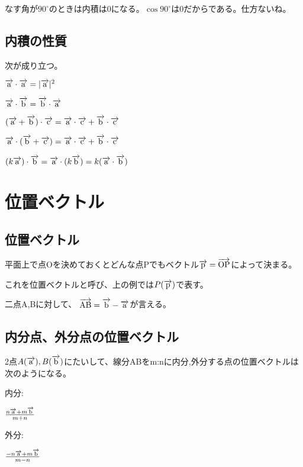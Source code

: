 \documentclass[a4paper]{jsarticle}
\newcommand{\abs}[1]{\lvert #1 \rvert}
\newcommand{\bekutoru}[1]{\overrightarrow{\rm #1}}
\newcommand{\itibekutoru}[2]{#1(\bekutoru{#2})}
\begin{document}
なす角が$90^{\circ}$のときは内積は0になる。$\cos90^{\circ}$は0だからである。仕方ないね。

\subsection*{内積の性質}
次が成り立つ。
\begin{screen}
  $\bekutoru{a}\cdot\bekutoru{a}=\abs{\bekutoru{a}}^2$\par
  $\bekutoru{a}\cdot\bekutoru{b}=\bekutoru{b}\cdot\bekutoru{a}$\par
  $(\bekutoru{a}+\bekutoru{b})\cdot\bekutoru{c}=\bekutoru{a}\cdot\bekutoru{c}+\bekutoru{b}\cdot\bekutoru{c}$\par
  $\bekutoru{a}\cdot(\bekutoru{b}+\bekutoru{c})=\bekutoru{a}\cdot\bekutoru{c}+\bekutoru{b}\cdot\bekutoru{c}$\par
  $(k\bekutoru{a})\cdot\bekutoru{b}=\bekutoru{a}\cdot(k\bekutoru{b})=k(\bekutoru{a}\cdot\bekutoru{b})$\par
\end{screen}



\section*{位置ベクトル}
\subsection*{位置ベクトル}
平面上で点Oを決めておくとどんな点Pでもベクトル$\bekutoru{p}=\bekutoru{OP}$によって決まる。\par
これを位置ベクトルと呼び、上の例では$\itibekutoru{P}{p}$で表す。\par

二点A,Bに対して、
$\bekutoru{AB}=\bekutoru{b}-\bekutoru{a}$が言える。

\subsection*{内分点、外分点の位置ベクトル}

2点$\itibekutoru{A}{a},\itibekutoru{B}{b}$にたいして、線分ABをm:nに内分,外分する点の位置ベクトルは次のようになる。
\begin{screen}
  内分:\par
  $\frac{n\bekutoru{a}+m\bekutoru{b}}{m+n}$\par
  外分:\par
  $\frac{-n\bekutoru{a}+m\bekutoru{b}}{m-n}$
\end{screen}
\end{document}
